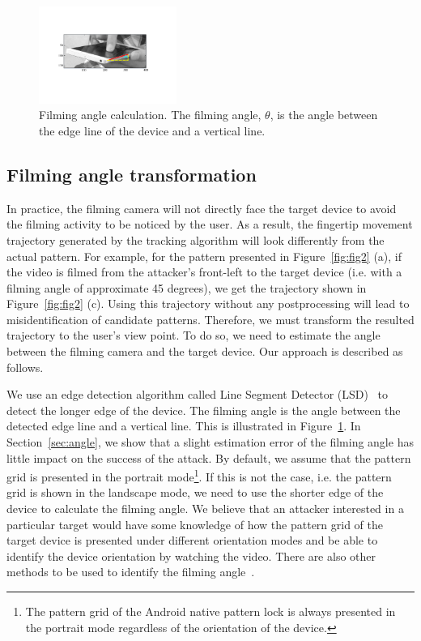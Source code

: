 \begin{figure}[!t]
    \centering
    \includegraphics[width=0.4\textwidth]{fig/line_detection.pdf}
    \caption{Filming angle calculation. The filming angle, $\theta$, is the angle between the edge line of the device and a vertical line.}
        \label{fig:line_detection}
\end{figure}
\subsection{Filming angle transformation}
\label{sec:transformation}
In practice, the filming camera will not directly face the target device to avoid the filming activity to be noticed by the user. As a result, the
fingertip movement trajectory generated by the tracking
algorithm will look differently from the actual pattern. For example, for the
pattern presented in Figure~\ref{fig:fig2} (a), if the video is filmed from the attacker's front-left to the target device (i.e. with a filming angle of approximate 45 degrees),
we get the trajectory shown in Figure~\ref{fig:fig2} (c).
Using this trajectory without any postprocessing will lead to misidentification of candidate patterns.
Therefore, we must transform the resulted trajectory to the user's view point. To do so, we need to estimate the angle between the filming camera and the target device. Our approach is described as follows.

We use an edge detection algorithm called Line Segment Detector (LSD)~\cite{grompone2010lsd} to detect the longer edge of the device.
The filming angle is the angle between the detected edge line and a vertical line. This is illustrated in Figure~\ref{fig:line_detection}.
In Section~\ref{sec:angle}, we show that a slight estimation error of the filming angle has little impact on the success of the attack.
By default, we assume that the pattern grid is presented in the portrait
mode\footnote{The pattern grid of the Android native pattern lock is always presented in the portrait mode regardless of the orientation of the device.}. If this is
not the case, i.e. the pattern grid is shown in the landscape mode, we need
to use the shorter edge of the device to calculate the filming angle. We believe that an attacker interested in a particular target would
have some knowledge of how the pattern grid of the target device is presented under different orientation modes and be able to identify the device orientation by watching the video.
There are also other methods to be used to identify the filming angle~\cite{Torralba:2002:DEI:628330.628820}.


